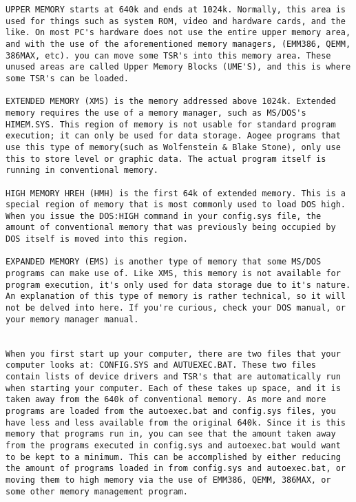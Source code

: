 \documentclass[book.tex]{subfiles}
\begin{document}
\begin{lstlisting}[breaklines=true,breakindent=0em]
UPPER MEMORY starts at 640k and ends at 1024k. Normally, this area is used for things such as system ROM, video and hardware cards, and the like. On most PC's hardware does not use the entire upper memory area, and with the use of the aforementioned memory managers, (EMM386, QEMM, 386MAX, etc). you can move some TSR's into this memory area. These unused areas are called Upper Memory Blocks (UME'S), and this is where some TSR's can be loaded.

EXTENDED MEMORY (XMS) is the memory addressed above 1024k. Extended memory requires the use of a memory manager, such as MS/DOS's HIMEM.SYS. This region of memory is not usable for standard program execution; it can only be used for data storage. Aogee programs that use this type of memory(such as Wolfenstein & Blake Stone), only use this to store level or graphic data. The actual program itself is running in conventional memory. 

HIGH MEMORY HREH (HMH) is the first 64k of extended memory. This is a special region of memory that is most commonly used to load DOS high. When you issue the DOS:HIGH command in your config.sys file, the amount of conventional memory that was previously being occupied by DOS itself is moved into this region.

EXPANDED MEMORY (EMS) is another type of memory that some MS/DOS programs can make use of. Like XMS, this memory is not available for program execution, it's only used for data storage due to it's nature. An explanation of this type of memory is rather technical, so it will not be delved into here. If you're curious, check your DOS manual, or your memory manager manual.


When you first start up your computer, there are two files that your computer looks at: CONFIG.SYS and AUTUEXEC.BAT. These two files contain lists of device drivers and TSR's that are automatically run when starting your computer. Each of these takes up space, and it is taken away from the 640k of conventional memory. As more and more programs are loaded from the autoexec.bat and config.sys files, you have less and less available from the original 640k. Since it is this memory that programs run in, you can see that the amount taken away from the programs executed in config.sys and autoexec.bat would want to be kept to a minimum. This can be accomplished by either reducing the amount of programs loaded in from config.sys and autoexec.bat, or moving them to high memory via the use of EMM386, QEMM, 386MAX, or some other memory management program.   
   \end{lstlisting}

 
\end{document}
